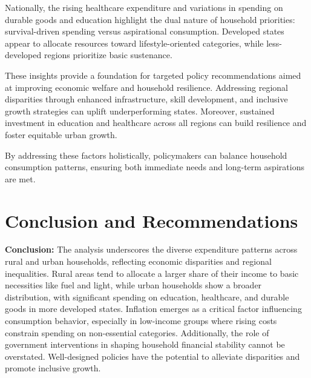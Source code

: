 \documentclass{article}
\begin{document}
	Nationally, the rising healthcare expenditure and variations in spending on durable goods and education highlight the dual nature of household priorities: survival-driven spending versus aspirational consumption. Developed states appear to allocate resources toward lifestyle-oriented categories, while less-developed regions prioritize basic sustenance.
	
	These insights provide a foundation for targeted policy recommendations aimed at improving economic welfare and household resilience. Addressing regional disparities through enhanced infrastructure, skill development, and inclusive growth strategies can uplift underperforming states. Moreover, sustained investment in education and healthcare across all regions can build resilience and foster equitable urban growth.
	
	By addressing these factors holistically, policymakers can balance household consumption patterns, ensuring both immediate needs and long-term aspirations are met.
	
	\section{Conclusion and Recommendations}
	
	\textbf{Conclusion:}  
	The analysis underscores the diverse expenditure patterns across rural and urban households, reflecting economic disparities and regional inequalities. Rural areas tend to allocate a larger share of their income to basic necessities like fuel and light, while urban households show a broader distribution, with significant spending on education, healthcare, and durable goods in more developed states. Inflation emerges as a critical factor influencing consumption behavior, especially in low-income groups where rising costs constrain spending on non-essential categories. Additionally, the role of government interventions in shaping household financial stability cannot be overstated. Well-designed policies have the potential to alleviate disparities and promote inclusive growth.
	
\end{document}
